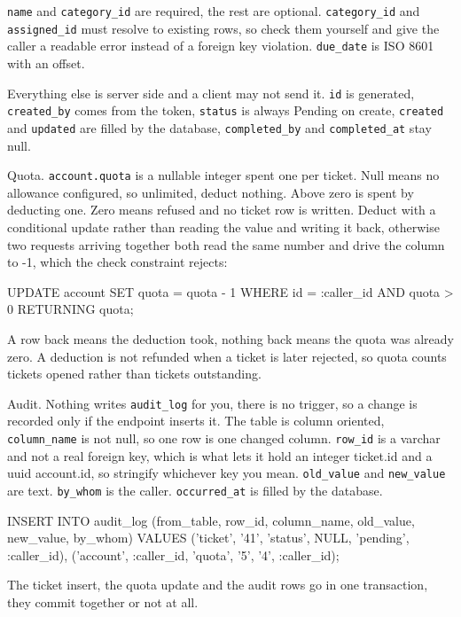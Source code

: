 \documentclass[12pt,letterpaper]{article}
\begin{document}
\texttt{name} and \texttt{category\_id} are required, the rest are optional.
\texttt{category\_id} and \texttt{assigned\_id} must resolve to existing rows,
so check them yourself and give the caller a readable error instead of a foreign
key violation. \texttt{due\_date} is ISO 8601 with an offset.

Everything else is server side and a client may not send it. \texttt{id} is
generated, \texttt{created\_by} comes from the token, \texttt{status} is always
Pending on create, \texttt{created} and \texttt{updated} are filled by the
database, \texttt{completed\_by} and \texttt{completed\_at} stay null.

Quota. \texttt{account.quota} is a nullable integer spent one per ticket. Null
means no allowance configured, so unlimited, deduct nothing. Above zero is spent
by deducting one. Zero means refused and no ticket row is written. Deduct with a
conditional update rather than reading the value and writing it back, otherwise
two requests arriving together both read the same number and drive the column to
-1, which the check constraint rejects:

\begin{code}
UPDATE account
   SET quota = quota - 1
 WHERE id = :caller_id
   AND quota > 0
RETURNING quota;
\end{code}

A row back means the deduction took, nothing back means the quota was already
zero. A deduction is not refunded when a ticket is later rejected, so quota
counts tickets opened rather than tickets outstanding.

Audit. Nothing writes \texttt{audit\_log} for you, there is no trigger, so a
change is recorded only if the endpoint inserts it. The table is column
oriented, \texttt{column\_name} is not null, so one row is one changed column.
\texttt{row\_id} is a varchar and not a real foreign key, which is what lets it
hold an integer ticket.id and a uuid account.id, so stringify whichever key you
mean. \texttt{old\_value} and \texttt{new\_value} are text. \texttt{by\_whom} is
the caller. \texttt{occurred\_at} is filled by the database.

\begin{code}
INSERT INTO audit_log
  (from_table, row_id, column_name,
   old_value, new_value, by_whom)
VALUES
  ('ticket', '41', 'status',
   NULL, 'pending', :caller_id),
  ('account', :caller_id, 'quota',
   '5', '4', :caller_id);
\end{code}

The ticket insert, the quota update and the audit rows go in one transaction,
they commit together or not at all.
\end{document}
